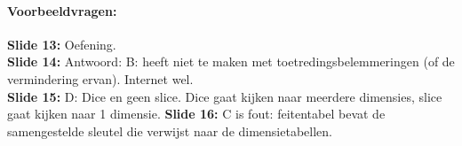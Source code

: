 \documentclass[10pt,a4paper]{report}
\begin{document}
\paragraph{Voorbeeldvragen:}
\textbf{Slide 13:} Oefening.\\
\textbf{Slide 14:} Antwoord: B: heeft niet te maken met toetredingsbelemmeringen (of de vermindering ervan). Internet wel. \\
\textbf{Slide 15:} D: Dice en geen slice. Dice gaat kijken naar meerdere dimensies, slice gaat kijken naar 1 dimensie.
\textbf{Slide 16:} C is fout: feitentabel bevat de samengestelde sleutel die verwijst naar de dimensietabellen. 
\end{document}
